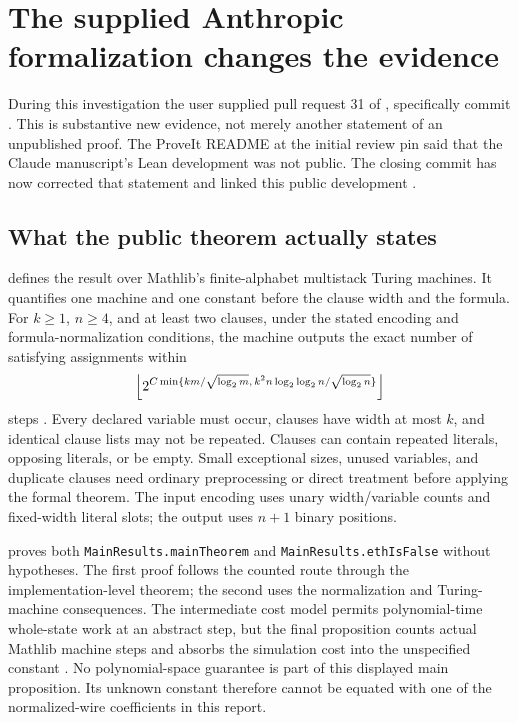 \section{The supplied Anthropic formalization changes the evidence}
\label{sec:formalization}

During this investigation the user supplied pull request 31 of
, specifically commit \anthpin. This is
substantive new evidence, not merely another statement of an unpublished
proof. The ProveIt README at the initial review pin said that the Claude
manuscript's Lean development was not public. The closing commit has now
corrected that statement and linked this public development
\cite{anthpr,closing}.

\subsection{What the public theorem actually states}
 defines the result over Mathlib's finite-alphabet
multistack Turing machines. It quantifies one machine and one constant before
the clause width and the formula. For $k\ge1$, $n\ge4$, and at least two
clauses, under the stated encoding and formula-normalization conditions,
the machine outputs the exact number of satisfying assignments within
\[
 \left\lfloor 2^{C\min\{km/\sqrt{\log_2m},\,
 k^2n\log_2\log_2n/\sqrt{\log_2n}\}}\right\rfloor
\]
steps \cite{anthmain}. Every declared variable must occur, clauses have
width at most $k$, and identical clause lists may not be repeated. Clauses
can contain repeated literals, opposing literals, or be empty. Small
exceptional sizes, unused variables, and duplicate clauses need ordinary
preprocessing or direct treatment before applying the formal theorem.
The input encoding uses unary width/variable counts and fixed-width literal
slots; the output uses $n+1$ binary positions.

 proves both \texttt{MainResults.mainTheorem} and
\texttt{MainResults.ethIsFalse} without hypotheses. The first proof follows
the counted route through the implementation-level theorem; the second
uses the normalization and Turing-machine consequences. The intermediate
cost model permits polynomial-time whole-state work at an abstract step,
but the final proposition counts actual Mathlib machine steps and absorbs
the simulation cost into the unspecified constant \cite{anthsolution}.
No polynomial-space guarantee is part of this displayed main proposition.
Its unknown constant therefore cannot be equated with one of the
normalized-wire coefficients in this report.

